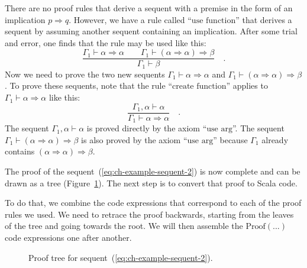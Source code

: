 There are no proof rules that derive a sequent with a premise in the
form of an implication $p\Rightarrow q$. However, we have a rule
called \textsf{``}$\text{use function}$\textsf{''} that derives a sequent by assuming
another sequent containing an implication. After some trial and error,
one finds that the rule may be used like this:
\[
\frac{\Gamma_{1}\vdash\alpha\Rightarrow\alpha\quad\quad\Gamma_{1}\vdash(\alpha\Rightarrow\alpha)\Rightarrow\beta}{\Gamma_{1}\vdash\beta}\quad.
\]
Now we need to prove the two new sequents $\Gamma_{1}\vdash\alpha\Rightarrow\alpha$
and $\Gamma_{1}\vdash(\alpha\Rightarrow\alpha)\Rightarrow\beta$.
To prove these sequents, note that the rule \textsf{``}$\text{create function}$\textsf{''}
applies to $\Gamma_{1}\vdash\alpha\Rightarrow\alpha$ like this:
\[
\frac{\Gamma_{1},\alpha\vdash\alpha}{\Gamma_{1}\vdash\alpha\Rightarrow\alpha}\quad.
\]
The sequent $\Gamma_{1},\alpha\vdash\alpha$ is proved directly by
the axiom \textsf{``}$\text{use arg}$\textsf{''}. The sequent $\Gamma_{1}\vdash(\alpha\Rightarrow\alpha)\Rightarrow\beta$
is also proved by the axiom \textsf{``}$\text{use arg}$\textsf{''} because $\Gamma_{1}$
already contains $(\alpha\Rightarrow\alpha)\Rightarrow\beta$.

The proof of the sequent~(\ref{eq:ch-example-sequent-2}) is now
complete and can be drawn as a tree (Figure~\ref{fig:Proof-of-the-sequent-example-2}).
The next step is to convert that proof to Scala code.

To do that, we combine the code expressions that correspond to each
of the proof rules we used. We need to retrace the proof backwards,
starting from the leaves of the tree and going towards the root. We
will then assemble the $\text{Proof}\left(...\right)$ code expressions
one after another.

\begin{figure}
\begin{centering}
{\footnotesize{}}%
\par\end{centering}
\caption{Proof tree for sequent~(\ref{eq:ch-example-sequent-2}).\label{fig:Proof-of-the-sequent-example-2}}
\end{figure}

